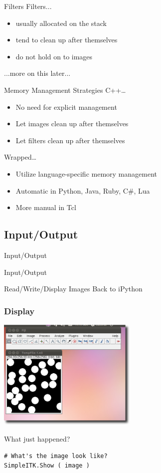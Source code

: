 \begin{frame}{Filters}
Filters...
\begin{itemize}
  \item usually allocated on the stack
  \item tend to clean up after themselves
  \item do not hold on to images
\end{itemize}
...more on this later...
\end{frame}

\begin{frame}{Memory Management Strategies}
C++\dots
\begin{itemize}
  \item No need for explicit management
  \item Let images clean up after themselves
  \item Let filters clean up after themselves
\end{itemize}
Wrapped\dots
\begin{itemize}
  \item Utilize language-specific memory management
  \item Automatic in Python, Java, Ruby, C\#, Lua
  \item More manual in Tcl
\end{itemize}
\end{frame}

\subsection{Input/Output}

\begin{frame}{Input/Output}
\fontsize{36pt}{36pt}\selectfont
\center
\begin{center}
Input/Output
\end{center}
\end{frame}

\begin{frame}{Read/Write/Display Images}
  Back to iPython
\end{frame}

\begin{frame}[fragile]
\frametitle{Display}
\begin{center}
  \includegraphics[width=0.5\textwidth]{Images/ImageDisplay_shadow}
\end{center}

What just happened?
\lstpython
\begin{lstlisting}
# What's the image look like?
SimpleITK.Show ( image )
\end{lstlisting}
\end{frame}

